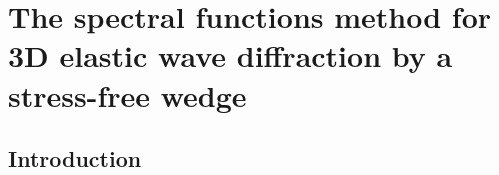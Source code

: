 \chapter[][3D Elastic Case]{The spectral functions method for 3D elastic wave diffraction by a stress-free wedge}
\label{chap-3D}

\section*{Introduction}